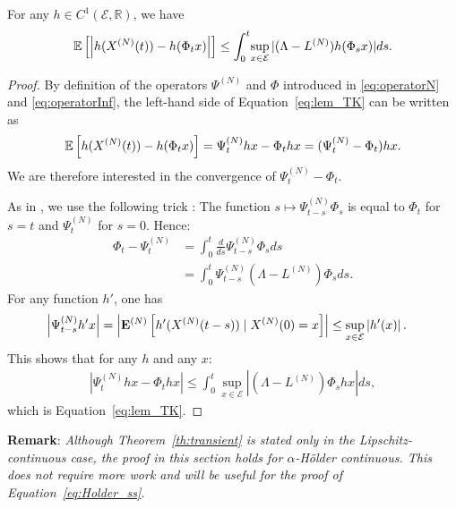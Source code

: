 \documentclass[acmlarge]{acmart}
\newcommand\XN{X^{(N)}}
\newcommand\LN{L^{(N)}}
\newcommand\PsiN{\Psi^{(N)}}
\newcommand\E{\mathcal{E}}
\newcommand\R{\mathbb{R}}
\newcommand\esp[1]{{\mathchoice{\besp{#1}}{\sesp{#1}}{\sesp{#1}}{\sesp{#1}}}}
\newcommand\besp[1]{\mathbb{E}\left[#1\right]}
\newcommand\sesp[1]{\mathbb{E}[#1]}
\newcommand\espN[1]{{\mathchoice{\bespN{#1}}{\sespN{#1}}{\sespN{#1}}{\sespN{#1}}}}
\newcommand\bespN[1]{\mathbf{E}^{(N)}\left[#1\right]}
\newcommand\sespN[1]{\mathbf{E}^{(N)}[#1]}
\newcommand\abs[1]{\left|#1\right|}
\begin{document}
\begin{lemma}
  \label{lem:trotter-kurtz}
  For any $h\in C^{1}(\E,\R)$, we have
  \begin{align}
    \esp{\abs{h(\XN(t))-h(\Phi_tx)}} \le
    \int_0^t\!\sup_{x\in\E}|(\Lambda-\LN)h(\Phi_sx)|ds.
    \label{eq:lem_TK}
  \end{align}
\end{lemma}
\begin{proof}
  By definition of the operators $\PsiN$ and $\Phi$ introduced in
  \eqref{eq:operatorN} and \eqref{eq:operatorInf}, the left-hand side
  of Equation~\eqref{eq:lem_TK} can be written as
  \begin{align*}
    \esp{h(\XN(t))-h(\Phi_tx)} = \PsiN_thx-\Phi_thx =
    (\PsiN_t-\Phi_t)hx. 
  \end{align*}
  We are therefore interested in the convergence of
  $\PsiN_t-\Phi_t$. 

  As in \cite[Theorem~1]{kolokoltsov2011mean}, we use the following
  trick : The function $s\mapsto\PsiN_{t-s}\Phi_s$ is equal to
  $\Phi_t$ for $s=t$ and $\PsiN_t$ for $s=0$.  Hence:
  \begin{align}
    \Phi_t - \PsiN_t  &= \int_0^t \frac{d}{ds} \PsiN_{t-s}\Phi_s ds\nonumber\\
                       &=\int_0^t \PsiN_{t-s}(\Lambda-\LN)\Phi_sds. 
  \end{align}
  For any function $h'$, one has
  \begin{align*}
    \abs{\PsiN_{t-s}h'x} &= \abs{\espN{h'(\XN(t-s))\mid \XN(0)=x}}
                         \le\sup_{x\in\E} \abs{h'(x)}. 
  \end{align*}
  This shows that for any $h$ and any $x$: 
  \begin{align*}
    \abs{\PsiN_thx -  \Phi_thx} \le \int_0^t\sup_{x\in\E}
    \abs{(\Lambda-\LN)\Phi_shx}ds,
  \end{align*}
  which is Equation~\eqref{eq:lem_TK}. 
  \end{proof}


\textbf{Remark}: \emph{ Although Theorem~\ref{th:transient} is stated
  only in the Lipschitz-continuous case, the proof in this section
  holds for $\alpha$-Hölder continuous. This does not require more
  work and will be useful for the proof of
  Equation~\eqref{eq:Holder_ss}.}
\end{document}

